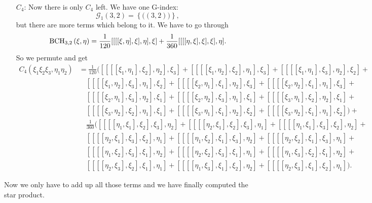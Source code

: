 \begin{itemize}
	\item[$C_4$:]
	Now there is only $C_4$ left. We have one G-index:
	\begin{equation*}
		\mathcal{G}_1(3,2) 
		= 
		\left\{ \big( (3,2) \big) \right\},
	\end{equation*}
	but there are more terms which belong to it. We have to go through
	\begin{equation*}
		\mathrm{BCH}_{3, 2}\left(\xi, \eta\right)
		=
		\frac{1}{120} [[[[\xi, \eta], \xi], \eta], \xi] +
		\frac{1}{360} [[[[\eta, \xi], \xi], \xi], \eta].
	\end{equation*}
	So we permute and get
	\begin{align*}
		C_4(\xi_1 \xi_2 \xi_3, \eta_1 \eta_2)
		& =
		\frac{1}{120} 
		\big( 
			[[[[\xi_1, \eta_1], \xi_2], \eta_2], \xi_3] + 
			[[[[\xi_1, \eta_2], \xi_2], \eta_1], \xi_3] + 
			[[[[\xi_1, \eta_1], \xi_3], \eta_2], \xi_2] +
		\\
		& \quad
			[[[[\xi_1, \eta_2], \xi_3], \eta_1], \xi_2] + 
			[[[[\xi_2, \eta_1], \xi_1], \eta_2], \xi_3] + 
			[[[[\xi_2, \eta_2], \xi_1], \eta_1], \xi_3] +
		\\
		& \quad
			[[[[\xi_2, \eta_1], \xi_3], \eta_2], \xi_1] + 
			[[[[\xi_2, \eta_2], \xi_3], \eta_1], \xi_1] + 
			[[[[\xi_3, \eta_1], \xi_2], \eta_2], \xi_1] +
		\\
		& \quad
			[[[[\xi_3, \eta_2], \xi_2], \eta_1], \xi_1] + 
			[[[[\xi_3, \eta_1], \xi_1], \eta_2], \xi_2] + 
			[[[[\xi_3, \eta_2], \xi_1], \eta_1], \xi_2] 
		\big) +
		\\
		& \quad
		\frac{1}{360} 
		\big( 
			[[[[\eta_1, \xi_1], \xi_2], \xi_3], \eta_2] + 
			[[[[\eta_2, \xi_1], \xi_2], \xi_3], \eta_1] + 
			[[[[\eta_1, \xi_1], \xi_3], \xi_2], \eta_2] +
		\\
		& \quad
			[[[[\eta_2, \xi_1], \xi_3], \xi_2], \eta_1] + 
			[[[[\eta_1, \xi_2], \xi_1], \xi_3], \eta_2] + 
			[[[[\eta_2, \xi_2], \xi_1], \xi_3], \eta_1] +
		\\
		& \quad
			[[[[\eta_1, \xi_2], \xi_3], \xi_1], \eta_2] + 
			[[[[\eta_2, \xi_2], \xi_3], \xi_1], \eta_1] + 
			[[[[\eta_1, \xi_3], \xi_2], \xi_1], \eta_2] +
		\\
		& \quad
			[[[[\eta_2, \xi_3], \xi_2], \xi_1], \eta_1] + 
			[[[[\eta_1, \xi_3], \xi_1], \xi_2], \eta_2] + 
			[[[[\eta_2, \xi_3], \xi_1], \xi_2], \eta_1] 
		\big).
	\end{align*}
\end{itemize}
Now we only have to add up all those terms and we have finally computed the 
star product.
